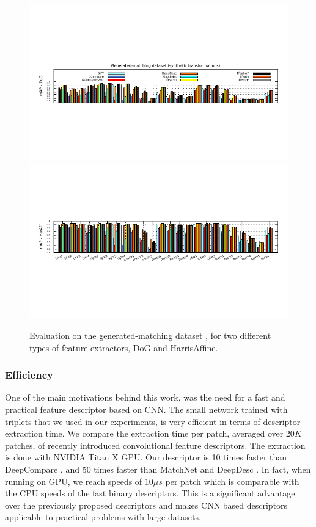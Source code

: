 \begin{figure}
\centering    
\includegraphics[trim={0.22cm 2.6cm 0.22cm 2.6cm},width=\textwidth]{main/chapter02/images/fischer_dog}
\includegraphics[trim={0.22cm 3cm 0.22cm 3cm},width=\textwidth]{main/chapter02/images/fischer_haraff}
\caption{Evaluation on the generated-matching dataset
  \cite{FDB14}, for two different types of feature
  extractors, DoG and  HarrisAffine.}
\label{fig:fischer_results}
\vspace{-0.2cm}
\end{figure}


\subsubsection{Efficiency}
One of the main motivations behind this work, was the need for a fast
and practical feature descriptor based on CNN. The small network trained with triplets
that we used in our experiments, is very
efficient in terms of descriptor extraction time.  We compare the extraction time
 per patch, averaged over $20K$ patches, of  recently
introduced convolutional feature descriptors. The extraction is done with NVIDIA Titan X GPU.
Our descriptor is 10 times faster than
DeepCompare \cite{ZagoruykoCVPR2015}, and 50 times faster than
MatchNet \cite{Han_2015_CVPR} and DeepDesc \cite{simo2015deepdesc}. In fact,
when running on GPU, we reach speeds of ${10\mu s}$ per patch which
is comparable with the CPU speeds of the fast binary
descriptors\cite{Calonder:2010:BBR:1888089.1888148}.  This is a
significant advantage over the previously proposed descriptors and
makes CNN based descriptors applicable to practical problems with
large datasets.

